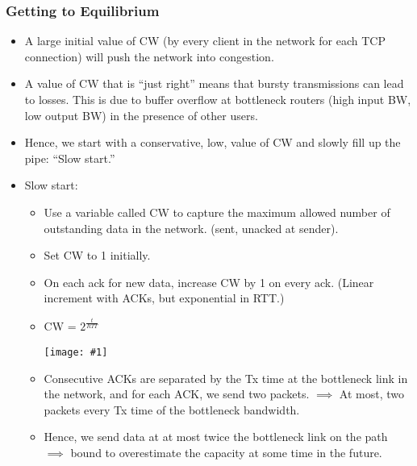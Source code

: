 \documentclass{report}
\makeatletter
\def\maxwidth#1{\ifdim\Gin@nat@width>#1 #1\else\Gin@nat@width\fi}
\newcommand{\mygraphic}[1]{
\begin{center}
    \texttt{[image: \#1]}
\end{center}
}
\makeatother
\begin{document}
\subsubsection{Getting to Equilibrium}
\begin{itemize}
\item A large initial value of CW (by every client in the network for each TCP connection) will push the network into congestion.
\item A value of CW that is ``just right'' means that bursty transmissions can lead to losses. This is due to buffer overflow at bottleneck routers (high input BW, low output BW) in the presence of other users.
\item Hence, we start with a conservative, low, value of CW and slowly fill up the pipe: ``Slow start.''
\item Slow start:
\begin{itemize}
    \item Use a variable called CW to capture the maximum allowed number of outstanding data in the network. (sent, unacked at sender).
    \item Set CW to 1 initially.
    \item On each ack for new data, increase CW by 1 on every ack. (Linear increment with ACKs, but exponential in RTT.)
    \item CW = $2^{\frac{t}{RTT}}$
    \mygraphic{rsrc/slowstart.png}
    \item Consecutive ACKs are separated by the Tx time at the bottleneck link in the network, and for each ACK, we send two packets. $\implies$ At most, two packets every Tx time of the bottleneck bandwidth.
    \item Hence, we send data at at most twice the bottleneck link on the path $\implies$ bound to overestimate the capacity at some time in the future.
\end{itemize}
\end{itemize}
\end{document}
